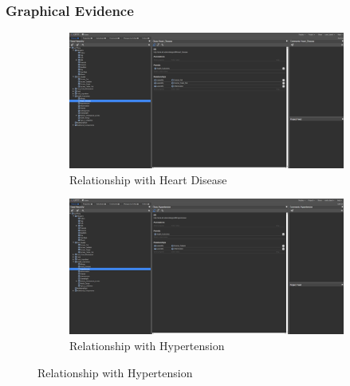 \documentclass[12pt,a4paper]{article}
\begin{document}
\subsubsection{Graphical Evidence}

\begin{figure}[H]
    \centering
    \begin{subfigure}[b]{0.45\textwidth}
        \includegraphics[width=\textwidth]{screenshots/inflammation_1.png}
        \caption{Relationship with Heart Disease}
    \end{subfigure}
    \hfill
    \begin{subfigure}[b]{0.45\textwidth}
        \includegraphics[width=\textwidth]{screenshots/inflammation_2.png}
        \caption{Relationship with Hypertension}
    \end{subfigure}
    
    \vspace{0.5cm}
    

\end{figure}
\end{document}
